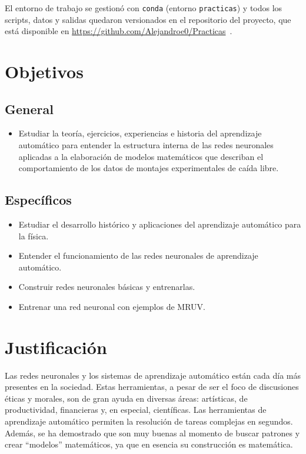 \documentclass[titlepage,11pt]{article}
\begin{document}
El entorno de trabajo se gestionó con \texttt{conda} (entorno
\texttt{practicas}) y todos los scripts, datos y salidas quedaron versionados
en el repositorio del proyecto, que está disponible en
\url{https://github.com/Alejandroe0/Practicas}~\cite{repositorio}.


\section{Objetivos}
\label{sec:objetivos}

\subsection{General}
\label{sec:general}
\begin{itemize}
\item Estudiar la teoría, ejercicios, experiencias e historia del aprendizaje
  automático para entender la estructura interna de las redes neuronales
  aplicadas a la elaboración de modelos matemáticos que describan el
  comportamiento de los datos de montajes experimentales de caída libre.
\end{itemize}

\subsection{Específicos}
\label{sec:especificos}
\begin{itemize}
\item Estudiar el desarrollo histórico y aplicaciones del aprendizaje
  automático para la física.
\item Entender el funcionamiento de las redes neuronales de aprendizaje
  automático.
\item Construir redes neuronales básicas y entrenarlas.
\item Entrenar una red neuronal con ejemplos de MRUV.
\end{itemize}


\section{Justificación}
\label{sec:justificacion}
Las redes neuronales y los sistemas de aprendizaje automático están cada día
más presentes en la sociedad. Estas herramientas, a pesar de ser el foco de
discusiones éticas y morales, son de gran ayuda en diversas áreas: artísticas,
de productividad, financieras y, en especial, científicas. Las herramientas de
aprendizaje automático permiten la resolución de tareas complejas en segundos.
Además, se ha demostrado que son muy buenas al momento de buscar patrones y
crear \enquote{modelos} matemáticos, ya que en esencia su construcción es
matemática.
\end{document}
